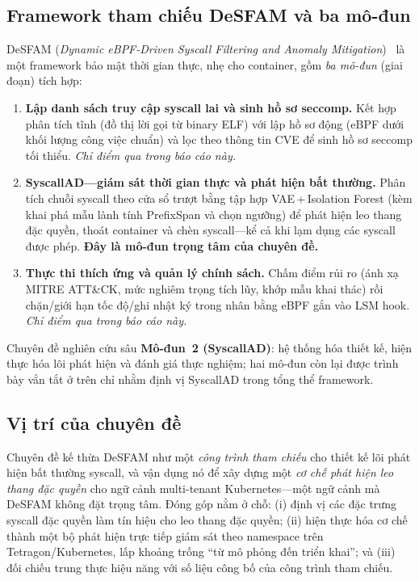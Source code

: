 \subsection{Framework tham chiếu DeSFAM và ba mô-đun}
\label{subsec:desfam_modules}
DeSFAM (\emph{Dynamic eBPF-Driven Syscall Filtering and Anomaly Mitigation})~\cite{desfam_original}
là một framework bảo mật thời gian thực, nhẹ cho container, gồm \emph{ba mô-đun}
(giai đoạn) tích hợp:
\begin{enumerate}[label=\textbf{Mô-đun \arabic*.},leftmargin=2.4em]
  \item \textbf{Lập danh sách truy cập syscall lai và sinh hồ sơ seccomp.} Kết hợp
        phân tích tĩnh (đồ thị lời gọi từ binary ELF) với lập hồ sơ động (eBPF dưới
        khối lượng công việc chuẩn) và lọc theo thông tin CVE để sinh hồ sơ seccomp
        tối thiểu. \emph{Chỉ điểm qua trong báo cáo này.}
  \item \textbf{SyscallAD---giám sát thời gian thực và phát hiện bất thường.} Phân
        tích chuỗi syscall theo cửa sổ trượt bằng tập hợp VAE\,+\,Isolation Forest
        (kèm khai phá mẫu lành tính PrefixSpan và chọn ngưỡng) để phát hiện leo
        thang đặc quyền, thoát container và chèn syscall---kể cả khi lạm dụng các
        syscall được phép. \textbf{Đây là mô-đun trọng tâm của chuyên đề.}
  \item \textbf{Thực thi thích ứng và quản lý chính sách.} Chấm điểm rủi ro (ánh xạ
        MITRE ATT\&CK, mức nghiêm trọng tích lũy, khớp mẫu khai thác) rồi
        chặn/giới hạn tốc độ/ghi nhật ký trong nhân bằng eBPF gắn vào LSM hook.
        \emph{Chỉ điểm qua trong báo cáo này.}
\end{enumerate}
Chuyên đề nghiên cứu sâu \textbf{Mô-đun~2 (SyscallAD)}: hệ thống hóa thiết kế, hiện
thực hóa lõi phát hiện và đánh giá thực nghiệm; hai mô-đun còn lại được trình bày
vắn tắt ở trên chỉ nhằm định vị SyscallAD trong tổng thể framework.

\subsection{Vị trí của chuyên đề}
Chuyên đề kế thừa DeSFAM như một \emph{công trình tham chiếu} cho thiết kế lõi phát
hiện bất thường syscall, và vận dụng nó để xây dựng một \emph{cơ chế phát hiện leo
thang đặc quyền} cho ngữ cảnh multi-tenant Kubernetes---một ngữ cảnh mà DeSFAM
không đặt trọng tâm. Đóng góp nằm ở chỗ: (i) định vị các đặc trưng syscall đặc
quyền làm tín hiệu cho leo thang đặc quyền; (ii) hiện thực hóa cơ chế thành một bộ
phát hiện trực tiếp giám sát theo namespace trên Tetragon/Kubernetes, lấp khoảng
trống ``từ mô phỏng đến triển khai''; và (iii) đối chiếu trung thực hiệu năng với
số liệu công bố của công trình tham chiếu.
